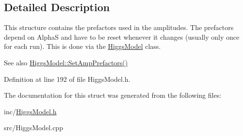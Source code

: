 \subsection{Detailed Description}
This structure contains the prefactors used in the amplitudes. The prefactors depend on Alpha\+S and have to be reset whenever it changes (usually only once for each run). This is done via the \hyperlink{classHiggsModel}{Higgs\+Model} class. \begin{DoxySeeAlso}{See also}
\hyperlink{classHiggsModel_a514e3dd7854409c622b8e200fe2ee84c}{Higgs\+Model\+::\+Set\+Amp\+Prefactors()} 
\end{DoxySeeAlso}


Definition at line 192 of file Higgs\+Model.\+h.



The documentation for this struct was generated from the following files\+:\begin{DoxyCompactItemize}
\item 
inc/\hyperlink{HiggsModel_8h}{Higgs\+Model.\+h}\item 
src/Higgs\+Model.\+cpp\end{DoxyCompactItemize}
